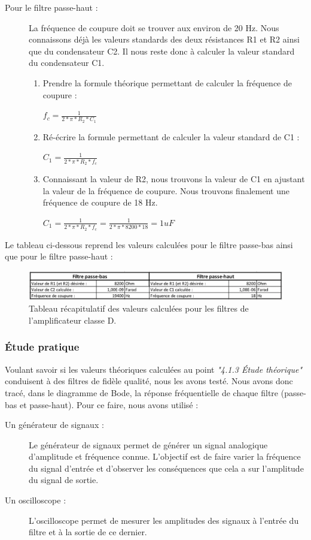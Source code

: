 \documentclass[10pt, oneside, a4paper]{article}
\begin{document}
\begin{description}
\item[ Pour le filtre passe-haut :] La fréquence de coupure doit se trouver aux environ de 20 Hz. Nous connaissons déjà les valeurs standards des deux résistances R1 et R2 ainsi que du condensateur C2. Il nous reste donc à calculer la valeur standard du condensateur C1.
	\begin{enumerate}
		\item Prendre la formule théorique permettant de calculer la fréquence de coupure :
			\begin{center} $f_{c}=\frac{1}{2*\pi*R_{2}*C_{1}}$ \end{center} 
		\item Ré-écrire la formule permettant de calculer la valeur standard de C1 : 
			\begin{center} $C_{1}=\frac{1}{2*\pi*R_{2}*f_{c}}$ \end{center} 
		\item Connaissant la valeur de R2, nous trouvons la valeur de C1 en ajustant la valeur de la fréquence de coupure. Nous trouvons finalement une fréquence de coupure de 18 Hz. 
			\begin{center} $C_{1}=\frac{1}{2*\pi*R_{2}*f_{c}}=\frac{1}{2*\pi*8200*18} = 1uF $ \end{center} 
	\end{enumerate}
\end{description}

Le tableau ci-dessous reprend les valeurs calculées pour le filtre passe-bas ainsi que pour le filtre passe-haut :
\begin{figure}
    \centering
    \includegraphics[scale = 0.65]{eps/Tableau_Filtres.jpg}
    \caption{Tableau récapitulatif des valeurs calculées pour les filtres de l'amplificateur classe D.}
    \label{fig:classeD}
\end{figure}

\subsubsection{Étude pratique}
Voulant savoir si les valeurs théoriques calculées au point \textit{"4.1.3 Étude théorique"} conduisent à des filtres de fidèle qualité, nous les avons testé. Nous avons donc tracé, dans le diagramme de Bode, la réponse fréquentielle de chaque filtre (passe-bas et passe-haut). Pour ce faire, nous avons utilisé : 
\begin{description}
\item[ Un générateur de signaux :] Le générateur de signaux permet de générer un signal analogique d'amplitude et fréquence connue. L'objectif est de faire varier la fréquence du signal d'entrée et d'observer les conséquences que cela a sur l'amplitude du signal de sortie. 
\item[ Un oscilloscope :] L'oscilloscope permet de mesurer les amplitudes des signaux à l'entrée du filtre et à la sortie de ce dernier.
\end{description}
\end{document}
